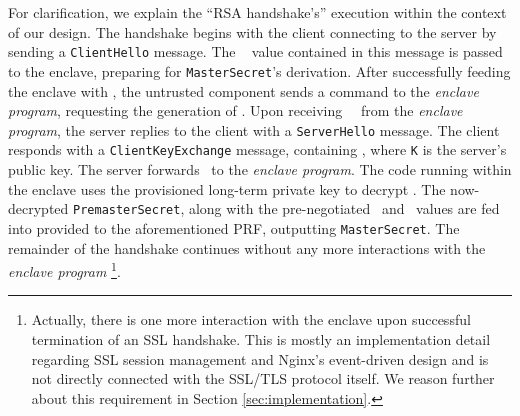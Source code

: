 \documentclass[../../main.tex]{subfiles}
\begin{document}
For clarification, we explain the ``RSA handshake's'' execution within
the context of our design. The handshake begins with the client
connecting to the server by sending a \texttt{ClientHello} message.
The \crandom~ value contained in this message is passed to the
enclave, preparing for \texttt{MasterSecret}'s derivation. After
successfully feeding the enclave with \crandom, the untrusted
component sends a command to the \textit{enclave program}, requesting
the generation of \srandom. Upon receiving ~\srandom~from the
\textit{enclave program}, the server replies to the client with a
\texttt{ServerHello} message. The client responds with a
\texttt{ClientKeyExchange} message, containing \premaster, where
\texttt{K} is the server's public key. The server forwards
\premaster~to the \textit{enclave program}. The code running within
the enclave uses the provisioned long-term private key to decrypt
\premaster. The now-decrypted \texttt{PremasterSecret}, along with the
pre-negotiated \crandom~and \srandom~values are fed into provided to
the aforementioned PRF, outputting \texttt{MasterSecret}. The remainder
of the handshake continues without any more interactions with the
\textit{enclave program} \footnote{Actually, there is one more
  interaction with the enclave upon successful termination of an SSL
  handshake. This is mostly an implementation detail regarding SSL
  session management and Nginx's event-driven design and is not
  directly connected with the SSL/TLS protocol itself. We reason
  further about this requirement in Section
  \ref{sec:implementation}.}. %

\end{document}
